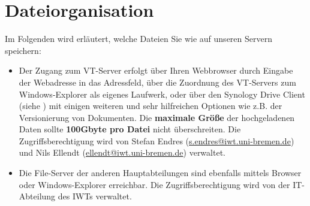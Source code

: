 \section{Dateiorganisation}\label{ssc:Dateiorganisation}
Im Folgenden wird erläutert, welche Dateien Sie wie auf unseren Servern
speichern:
\begin{itemize}
  \item Der Zugang zum VT-Server erfolgt über Ihren Webbrowser durch Eingabe der Webadresse
        in das Adressfeld, über die Zuordnung des VT-Servers zum
        Windows-Explorer als eigenes Laufwerk, oder über den Synology Drive
        Client (siehe \cite{synology2022}) mit einigen weiteren und sehr
        hilfreichen Optionen wie z.B. der Versionierung von Dokumenten.
        Die \textbf{maximale Größe} der hochgeladenen Daten sollte
        \textbf{100Gbyte pro Datei} nicht überschreiten. Die
        Zugriffsberechtigung wird von
        Stefan Endres (\href{mailto:s.endres@iwt.uni-bremen.de}%
                       {s.endres@iwt.uni-bremen.de})
        und Nils Ellendt (\href{mailto:ellendt@iwt.uni-bremen.de}%
                          {ellendt@iwt.uni-bremen.de})
        verwaltet.
  \item Die File-Server der anderen Hauptabteilungen sind ebenfalls mittels
        Browser oder Win\-dows-Explorer erreichbar. Die Zugriffsberechtigung wird von der
        IT-Abteilung des IWTs verwaltet.
\end{itemize}

